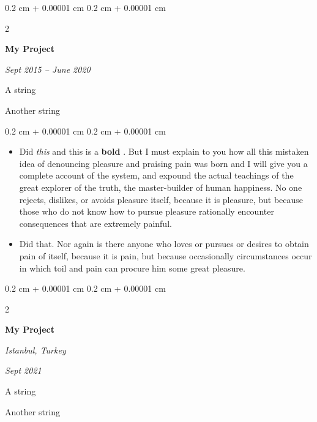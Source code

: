 \documentclass[10pt, letterpaper]{article}
\newenvironment{summary}{
    \begin{description}[
        topsep=0.10 cm,
        parsep=0.10 cm,
        partopsep=0pt,
        itemsep=0pt,
        leftmargin=0.4 cm + 10pt
    ]
}{
    \end{description}
} %
\newenvironment{highlights}{
    \begin{itemize}[
        topsep=0.10 cm,
        parsep=0.10 cm,
        partopsep=0pt,
        itemsep=0pt,
        leftmargin=0.4 cm + 10pt
    ]
}{
    \end{itemize}
} %
\newenvironment{onecolentry}{
    \begin{adjustwidth}{
        0.2 cm + 0.00001 cm
    }{
        0.2 cm + 0.00001 cm
    }
}{
    \end{adjustwidth}
} %
\newenvironment{twocolentry}[2][]{
    \onecolentry
    \def\secondColumn{#2}
    \setcolumnwidth{\fill, 4.5 cm}
    \begin{paracol}{2}
}{
    \switchcolumn \raggedleft \secondColumn
    \end{paracol}
    \endonecolentry
} %
\let\hrefWithoutArrow\href
\renewcommand{\href}[2]{\hrefWithoutArrow{#1}{\ifthenelse{\equal{#2}{}}{ }{#2 }\raisebox{.15ex}{\footnotesize \faExternalLink*}}}
\begin{document}
        \begin{twocolentry}{
            
            
        \textit{Sept 2015 – June 2020}}
            \textbf{My Project}
        \end{twocolentry}
            \begin{summary}
                \item A string
                \item Another string
            \end{summary}
        \vspace{0.10 cm}
        \begin{onecolentry}
            \begin{highlights}
                \item Did \textit{this} and this is a \textbf{bold} \href{https://example.com}{link}. But I must explain to you how all this mistaken idea of denouncing pleasure and praising pain was born and I will give you a complete account of the system, and expound the actual teachings of the great explorer of the truth, the master-builder of human happiness. No one rejects, dislikes, or avoids pleasure itself, because it is pleasure, but because those who do not know how to pursue pleasure rationally encounter consequences that are extremely painful.
                \item Did that. Nor again is there anyone who loves or pursues or desires to obtain pain of itself, because it is pain, but because occasionally circumstances occur in which toil and pain can procure him some great pleasure.
            \end{highlights}
        \end{onecolentry}


        \vspace{0.2 cm}

        \begin{twocolentry}{
        \textit{Istanbul, Turkey}    
            
        \textit{Sept 2021}}
            \textbf{My Project}
        \end{twocolentry}
            \begin{summary}
                \item A string
                \item Another string
            \end{summary}


        \vspace{0.2 cm}
\end{document}
